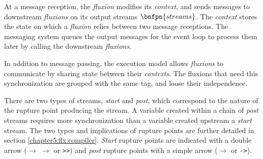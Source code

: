 At a message reception, the \textit{fluxion} modifies its \textit{context}, and sends messages to downstream \textit{fluxions} on its output streams $\bnfpn{streams}$.
The \textit{context} stores the state on which a \textit{fluxion} relies between two message receptions.
The messaging system queues the output messages for the event loop to process them later by calling the downstream \textit{fluxions}.

In addition to message passing, the execution model allows \textit{fluxions} to communicate by sharing state between their \textit{contexts}.
The fluxions that need this synchronization are grouped with the same tag, and loose their independence.

There are two types of streams, \textit{start} and \textit{post}, which correspond to the nature of the rupture point producing the stream.
A variable created within a chain of \textit{post} streams requires more synchronization than a variable created upstream a \textit{start} stream.
The two types and implications of rupture points are further detailed in section \ref{chapter5:flx:compiler}.
\textit{Start} rupture points are indicated with a double arrow ($\to$ \hspace{-1.4em} $\to$ or \texttt{>>}) and \textit{post} rupture points with a simple arrow ($\to$ or \texttt{->}).
